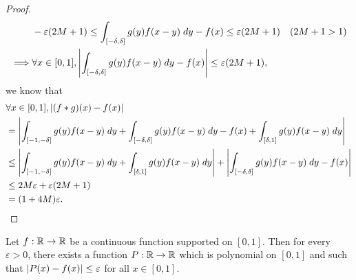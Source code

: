 \begin{proof}
\begin{align*}
             & -\varepsilon (2M + 1) \leq \int_{[-\delta, \delta]} g(y) f(x - y) \; dy - f(x) \leq \varepsilon (2M + 1)                      & (2M + 1 > 1)                                    \\
    \implies & \forall x \in [0, 1], \left\lvert\int_{[-\delta, \delta]} g(y) f(x - y) \; dy - f(x)\right\rvert \leq \varepsilon (2M + 1),
  \end{align*}
  we know that
  \begin{align*}
     & \forall x \in [0, 1], \left\lvert(f * g)(x) - f(x)\right\rvert                                                                                                            \\
     & = \left\lvert\int_{[-1, -\delta]} g(y) f(x - y) \; dy + \int_{[-\delta, \delta]} g(y) f(x - y) \; dy - f(x) + \int_{[\delta, 1]} g(y) f(x - y) \; dy\right\rvert          \\
     & \leq \left\lvert\int_{[-1, -\delta]} g(y) f(x - y) \; dy + \int_{[\delta, 1]} g(y) f(x - y) \; dy\right\rvert + \left\lvert\int_{[-\delta, \delta]} g(y) f(x - y) \; dy - f(x)\right\rvert \\
     & \leq 2 M \varepsilon + \varepsilon (2M + 1)                                                                                                              \\
     & = (1 + 4M) \varepsilon.
  \end{align*}
\end{proof}

\begin{cor}\label{ii:3.8.15}
  Let \(f : \mathbb{R} \to \mathbb{R}\) be a continuous function supported on \([0, 1]\).
  Then for every \(\varepsilon > 0\), there exists a function \(P : \mathbb{R} \to \mathbb{R}\) which is polynomial on \([0, 1]\) and such that \(\left\lvert P(x) - f(x)\right\rvert \leq \varepsilon\) for all \(x \in [0, 1]\).
\end{cor}


